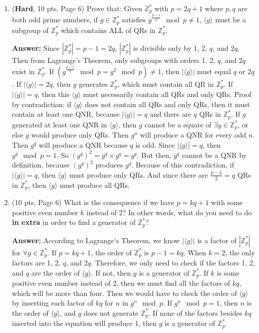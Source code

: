 \documentclass[10pt]{article}
\begin{document}
\begin{enumerate}
	\bigskip\item (\textbf{Hard}, 10 pts, Page 6) Prove that: Given $\mathbb{Z}_p^*$ with $p=2q+1$ where $p,q$ are both odd prime numbers, if $g\in\mathbb{Z}_p^*$ satisfies $g^{\frac{p-1}{q}}\mod p\neq 1$, $\langle g\rangle$ must be a subgroup of $\mathbb{Z}_p^*$ which contains ALL of QRs in $\mathbb{Z}_p^*$.
	
	\textbf{Answer:} \newline Since $|\mathbb{Z}_p^*| = p-1 = 2q$, $|\mathbb{Z}_p^*|$ is divisible only by 1, 2, $q$, and $2q$. Then from Lagrange's Theorem, only subgroups with orders 1, 2, $q$, and $2q$ exist in $\mathbb{Z}_p^*$. If $(g^{\frac{p-1}{q}}\mod p=g^{2}\mod p)\not=1$, then $|\langle g\rangle|$ must equal $q$ or $2q$. If $|\langle g\rangle| = 2q$, then $g$ generates $\mathbb{Z}_p^*$, which must contain all QR in $\mathbb{Z}_p^*$. If $|\langle g\rangle| = q$, then this $\langle g\rangle$ must necessarily contain all QRs and only QRs. Proof by contradiction: if $\langle g\rangle$ does not contain all QRs and only QRs, then it must contain at least one QNR, because $|\langle g\rangle| = q$ and there are $q$ QRs in $\mathbb{Z}_p^*$. If $g$ generated at least one QNR in $\langle g\rangle$, then $g$ cannot be a square of $\exists y\in\mathbb{Z}_p^*$, or else $g$ would produce only QRs. Then $g^n$ will produce a QNR for every odd $n$. Then $g^q$ will produce a QNR because $q$ is odd. Since $|\langle g\rangle| = q$, then $g^{q}\mod p = 1$. So $(g^q)^2=g^q\times g^q=g^q$. But then, $g^q$ cannot be a QNR by definition, because $(g^q)^2$ produces $g^q$. Because of this contradiction, if $|\langle g\rangle| = q$, then $\langle g\rangle$ must produce only QRs. And since there are $\frac{p-1}{2} = q$ QRs in $\mathbb{Z}_p^*$, then $\langle g\rangle$ must produce all QRs.
	
	\bigskip\item (10 pts, Page 6) What is the consequence if we have $p=kq+1$ with some positive even number $k$ instead of 2? In other words, what do you need to do \textbf{in extra} in order to find a generator of $\mathbb{Z}_p^*$?
	
	\textbf{Answer:} \newline According to Lagrange's Theorem, we know $|\langle g\rangle|$ is a factor of $|\mathbb{Z}_p^*|$ for $\forall g\in\mathbb{Z}_p^*$. If $p=kq+1$, the order of $\mathbb{Z}_p^*$ is $p-1 = kq$. When $k=2$, the only factors are 1, 2, $q$, and $2q$. Therefore, we only need to check if the factors 1, 2, and $q$ are the order of $\langle g\rangle$. If not, then $g$ is a generator of $\mathbb{Z}_p^*$. If $k$ is some positive even number instead of 2, then we must find all the factors of $kq$, which will be more than four. Then we would have to check the order of $\langle g\rangle$ by inserting each factor of $kq$ for $n$ in $g^n \mod p$. If $g^n \mod p = 1$, then $n$ is the order of $\langle g\rangle$, and $g$ does not generate $\mathbb{Z}_p^*$. If none of the factors besides $kq$ inserted into the equation will produce 1, then $g$ is a generator of $\mathbb{Z}_p^*$. 
	

\end{enumerate}
\end{document}
